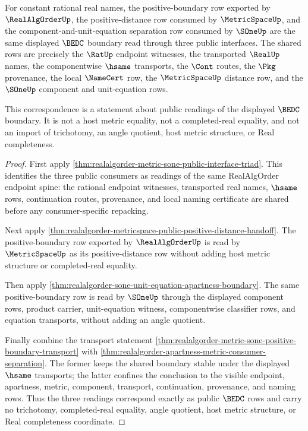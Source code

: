 \begin{theorem}
\label{thm:realalgorder-metric-sone-positive-boundary-correspondence}
For constant rational real names, the positive-boundary row exported by
$\RealAlgOrderUp$, the positive-distance row consumed by $\MetricSpaceUp$, and
the component-and-unit-equation separation row consumed by $\SOneUp$ are the
same displayed $\BEDC$ boundary read through three public interfaces. The shared
rows are precisely the $\RatUp$ endpoint witnesses, the transported $\RealUp$
names, the componentwise $\hsame$ transports, the $\Cont$ routes, the $\Pkg$
provenance, the local $\NameCert$ row, the $\MetricSpaceUp$ distance row, and
the $\SOneUp$ component and unit-equation rows.

This correspondence is a statement about public readings of the displayed
$\BEDC$ boundary. It is not a host metric equality, not a completed-real
equality, and not an import of trichotomy, an angle quotient, host metric
structure, or Real completeness.
\end{theorem}
\begin{proof}
First apply
\autoref{thm:realalgorder-metric-sone-public-interface-triad}. This identifies
the three public consumers as readings of the same RealAlgOrder endpoint spine:
the rational endpoint witnesses, transported real names, $\hsame$ rows,
continuation routes, provenance, and local naming certificate are shared before
any consumer-specific repacking.

Next apply
\autoref{thm:realalgorder-metricspace-public-positive-distance-handoff}. The
positive-boundary row exported by $\RealAlgOrderUp$ is read by $\MetricSpaceUp$
as its positive-distance row without adding host metric structure or
completed-real equality.

Then apply
\autoref{thm:realalgorder-sone-unit-equation-apartness-boundary}. The same
positive-boundary row is read by $\SOneUp$ through the displayed component rows,
product carrier, unit-equation witness, componentwise classifier rows, and
equation transports, without adding an angle quotient.

Finally combine the transport statement
\autoref{thm:realalgorder-metric-sone-positive-boundary-transport} with
\autoref{thm:realalgorder-apartness-metric-consumer-separation}. The former
keeps the shared boundary stable under the displayed $\hsame$ transports; the
latter confines the conclusion to the visible endpoint, apartness, metric,
component, transport, continuation, provenance, and naming rows. Thus the three
readings correspond exactly as public $\BEDC$ rows and carry no trichotomy,
completed-real equality, angle quotient, host metric structure, or Real
completeness coordinate.
\end{proof}
